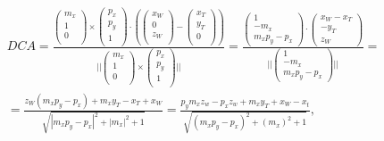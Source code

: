 \documentclass[a4paper,11pt]{article}
\begin{document}
\begin{equation}
\begin{split}
DCA = \frac{\begin{pmatrix} m_x \\ 1\\  0\\\end{pmatrix} \times \begin{pmatrix} p_x\\ p_y \\  1\\\end{pmatrix} \cdot (\begin{pmatrix}x_W  \\0 \\  z_W\\\end{pmatrix} - \begin{pmatrix}x_T \\y_T  \\  0\\\end{pmatrix}) }{||\begin{pmatrix} m_x \\ 1\\  0\\\end{pmatrix} \times \begin{pmatrix}p_x\\ p_y \\  1\\\end{pmatrix}||} =  \frac{\begin{pmatrix} 1 \\ -m_x \\ m_xp_y - p_x  \end{pmatrix} \cdot
\begin{pmatrix} x_W-x_T \\ -y_T \\ z_W  \end{pmatrix} }{||\begin{pmatrix} 1 \\ -m_x \\ m_xp_y - p_x  \end{pmatrix}||}  = \\
= \frac{z_W (m_x p_y-p_x)+m_x y_T-x_T+x_W}{\sqrt{\left| m_x p_y-p_x\right|^2+\left| m_x\right|^2+1}}
= \frac{ p_ym_xz_w-p_xz_w + m_xy_T + x_W - x_t }{\sqrt{(m_x p_y-p_x)^2+(m_x)^2+1}},
\label{eq:DCAGeom}
\end{split}
\end{equation}
\end{document}
